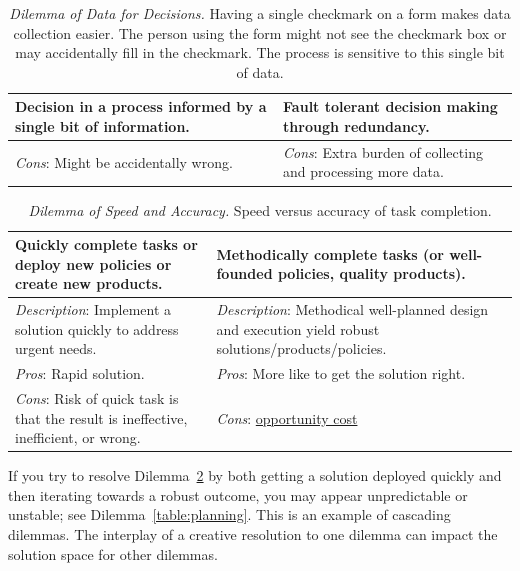 \begin{center}
\begin{table}[H] %
\begin{tabular}{ | m{\dilemmatablewidth}| m{\dilemmatablewidth} | } 
  \hline
  \textbf{Decision in a process informed by a single bit of information.} & 
  \textbf{Fault tolerant decision making through redundancy.} \\ 
  \hline
  \textit{Cons}: Might be accidentally wrong. &
  \textit{Cons}: Extra burden of collecting and processing more data. \\  
  \hline
\end{tabular}
\caption{\textit{Dilemma of Data for Decisions.}
Having a single checkmark on a form makes data collection easier. The person using the form might not see the checkmark box or may accidentally fill in the checkmark. The process is sensitive to this single bit of data.
}
\label{table:single-bit-decision}
\end{table}
\end{center}


\begin{center}
\begin{table}[H] %
\begin{tabular}{ | m{\dilemmatablewidth}| m{\dilemmatablewidth} | } 
  \hline
  \textbf{Quickly complete tasks or deploy new policies or create new products.} & 
  \textbf{Methodically complete tasks (or well-founded policies, quality products).} \\ 
  \hline
  \textit{Description}: Implement a solution quickly to address urgent needs. &
  \textit{Description}: Methodical well-planned design and execution yield robust solutions/products/policies. \\
  \hline
  \textit{Pros}: Rapid solution. &
  \textit{Pros}: More like to get the solution right. \\
  \hline
  \textit{Cons}: Risk of quick task is that the result is ineffective, inefficient, or wrong. &
  \textit{Cons}: \href{https://en.wikipedia.org/wiki/Opportunity_cost}{opportunity cost} \\  
  \hline
\end{tabular}
\caption{\textit{Dilemma of Speed and Accuracy.}
Speed versus accuracy of task completion.
}
\label{table:quick-methodical}
\end{table}
\end{center}

If you try to resolve Dilemma~\ref{table:quick-methodical} by both getting a solution deployed quickly and then iterating towards a robust outcome, you may appear unpredictable or unstable; see Dilemma~\ref{table:planning}. This is an example of cascading dilemmas. The interplay of a creative resolution to one dilemma can impact the solution space for other dilemmas. 

